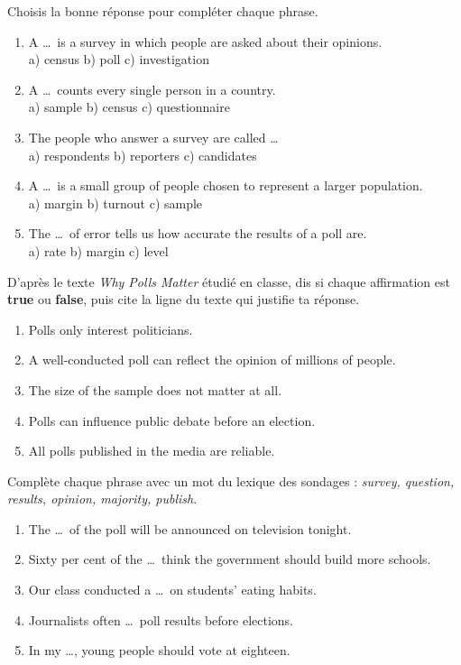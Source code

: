 \documentclass[11pt]{article}
\begin{document}
\begin{exercice}
Choisis la bonne réponse pour compléter chaque phrase.
\begin{enumerate}
\item A \ldots\ is a survey in which people are asked about their opinions.\\
a) census \quad b) poll \quad c) investigation
\item A \ldots\ counts every single person in a country.\\
a) sample \quad b) census \quad c) questionnaire
\item The people who answer a survey are called \ldots\\
a) respondents \quad b) reporters \quad c) candidates
\item A \ldots\ is a small group of people chosen to represent a larger population.\\
a) margin \quad b) turnout \quad c) sample
\item The \ldots\ of error tells us how accurate the results of a poll are.\\
a) rate \quad b) margin \quad c) level
\end{enumerate}
\end{exercice}

\begin{exercice}
D'après le texte \emph{Why Polls Matter} étudié en classe, dis si chaque affirmation est \textbf{true} ou \textbf{false}, puis cite la ligne du texte qui justifie ta réponse.
\begin{enumerate}
\item Polls only interest politicians.
\item A well-conducted poll can reflect the opinion of millions of people.
\item The size of the sample does not matter at all.
\item Polls can influence public debate before an election.
\item All polls published in the media are reliable.
\end{enumerate}
\end{exercice}

\begin{exercice}
Complète chaque phrase avec un mot du lexique des sondages : \emph{survey, question, results, opinion, majority, publish}.
\begin{enumerate}
\item The \ldots\ of the poll will be announced on television tonight.
\item Sixty per cent of the \ldots\ think the government should build more schools.
\item Our class conducted a \ldots\ on students' eating habits.
\item Journalists often \ldots\ poll results before elections.
\item In my \ldots, young people should vote at eighteen.
\end{enumerate}
\end{exercice}
\end{document}
